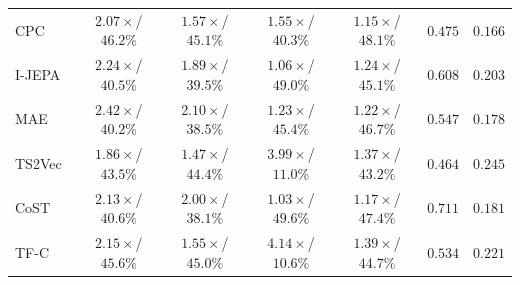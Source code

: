 \begin{table}[tp]
{\begin{tabular}{lcccccc}
CPC~\citep{oord2019representationlearningcontrastivepredictive} & $2.07{\scriptstyle\times}$/\textcolor{red!75!black}{$46.2{\scriptstyle\%}$} & $1.57{\scriptstyle\times}$/\textcolor{red!75!black}{$45.1{\scriptstyle\%}$} & \textcolor{red!75!black}{$1.55{\scriptstyle\times}$}/\textcolor{red!75!black}{$40.3{\scriptstyle\%}$} & \textcolor{red!75!black}{$1.15{\scriptstyle\times}$}/\textcolor{red!75!black}{$48.1{\scriptstyle\%}$} & \textcolor{red!75!black}{$0.475$} & $0.166$ \\
I-JEPA~\citep{assran2023selfsupervisedlearningimagesjointembedding} & $2.24{\scriptstyle\times}$/$40.5{\scriptstyle\%}$ & $1.89{\scriptstyle\times}$/$39.5{\scriptstyle\%}$ & \textcolor{red!75!black}{$1.06{\scriptstyle\times}$}/\textcolor{red!75!black}{$49.0{\scriptstyle\%}$} & $1.24{\scriptstyle\times}$/$45.1{\scriptstyle\%}$ & $0.608$ & $0.203$ \\
MAE~\citep{he_etal_2022} & $2.42{\scriptstyle\times}$/$40.2{\scriptstyle\%}$ & $2.10{\scriptstyle\times}$/$38.5{\scriptstyle\%}$ & \textcolor{red!75!black}{$1.23{\scriptstyle\times}$}/\textcolor{red!75!black}{$45.4{\scriptstyle\%}$} & $1.22{\scriptstyle\times}$/\textcolor{red!75!black}{$46.7{\scriptstyle\%}$} & $0.547$ & $0.178$ \\
TS2Vec~\citep{yue2022ts2vec} & $1.86{\scriptstyle\times}$/$43.5{\scriptstyle\%}$ & \textcolor{red!75!black}{$1.47{\scriptstyle\times}$}/$44.4{\scriptstyle\%}$ & \textcolor{green!45!black}{$\mathbf{3.99{\scriptstyle\times}}$}/\textcolor{green!45!black}{$\mathbf{11.0{\scriptstyle\%}}$} & $1.37{\scriptstyle\times}$/\textcolor{green!45!black}{$\mathbf{43.2{\scriptstyle\%}}$} & \textcolor{red!75!black}{$0.464$} & \textcolor{green!45!black}{$\mathbf{0.245}$} \\
CoST~\citep{woo2022costcontrastivelearningdisentangled} & $2.13{\scriptstyle\times}$/$40.6{\scriptstyle\%}$ & $2.00{\scriptstyle\times}$/$38.1{\scriptstyle\%}$ & \textcolor{red!75!black}{$1.03{\scriptstyle\times}$}/\textcolor{red!75!black}{$49.6{\scriptstyle\%}$} & $1.17{\scriptstyle\times}$/\textcolor{red!75!black}{$47.4{\scriptstyle\%}$} & \textcolor{green!45!black}{$\mathbf{0.711}$} & $0.181$ \\
TF-C~\citep{zhang2022selfsupervisedcontrastivepretrainingtime} & $2.15{\scriptstyle\times}$/\textcolor{red!75!black}{$45.6{\scriptstyle\%}$} & $1.55{\scriptstyle\times}$/\textcolor{red!75!black}{$45.0{\scriptstyle\%}$} & \textcolor{green!45!black}{$\mathbf{4.14{\scriptstyle\times}}$}/\textcolor{green!45!black}{$\mathbf{10.6{\scriptstyle\%}}$} & \textcolor{green!45!black}{$\mathbf{1.39{\scriptstyle\times}}$}/$44.7{\scriptstyle\%}$ & $0.534$ & $0.221$ \\

\end{tabular}}
\end{table}
